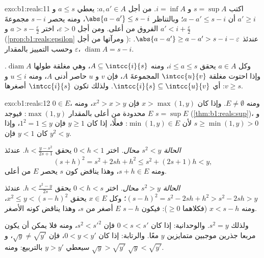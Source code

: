 \begin{solution}{exo:b1:reals:11}
اكتب $s = \sup A$ و $i = \inf A$. من أجل $a, a' \in A$: يعطي $a \leq s$
و $a' \geq i$ أن $a - a' \leq s - i$؛ وبالتناظر $\abs{a -
a'} \leq s - i$، ومنه يحصر $s - i$ مجموعةَ الفروق من أعلى. ومن أجل
$\varepsilon > 0$، اختر $a > s - \frac\varepsilon2$ و $a' < i
+ \frac\varepsilon2$ (\cref{prop:b1:reals:epsilon} ومرآتها
من أجل ): عندئذ $\abs{a - a'} \geq a - a' > s - i -
\varepsilon$. وحسب التمييز بالمقدار $\varepsilon$،
$\operatorname{diam} A = s - i$.

وكل $a \in A$ يحقق $i \leq a \leq s$، ومنه $A \subseteq
\intcc{i}{s}$، وهي  مغلقة طولها $\operatorname{diam}
A$. وإذا احتوت  مغلقة $\intcc{u}{v}$ المجموعةَ $A$، فإن $v$
 و $u$ حاصر أدنى  $A$، ومنه $u \leq i$ و $v
\geq s$: أي $\intcc{i}{s} \subseteq \intcc{u}{v}$. ولذلك
تكون $\intcc{i}{s}$ أصغرها.
\end{solution}

\begin{solution}{exo:b1:reals:12}
$0 \in E$، ومنه $E \neq \emptyset$. وإذا كان $x > \max(1, y)$ فإن $x^2 >
x > y$، ومنه  $E$ محدودة من أعلى بالمقدار $\max(1, y)$: فيوجد $s = \sup E$
(\cref{thm:b1:reals:sup})، و $s \geq \min(1, y) > 0$
لأن $\min(1, y) \in E$: فعلًا، إذا كان $y \geq 1$ فإن $1^2 = 1
\leq y$، وإذا كان $y < 1$ فإن $y^2 < y$.

\emph{الحالة $s^2 < y$ محال.} اختر $0 < h < 1$ يحقق $h <
\frac{y - s^2}{2s + 1}$. عندئذ
\[
(s + h)^2 = s^2 + 2sh + h^2 \leq s^2 + (2s + 1)h < y ,
\]
ومنه $s + h \in E$، وهذا يناقض كون $s$ يحصر $E$ من أعلى.

\emph{الحالة $s^2 > y$ محال.} اختر $0 < h < s$ يحقق $h <
\frac{s^2 - y}{2s}$. عندئذ $(s - h)^2 = s^2 - 2sh + h^2 > s^2 -
2sh > y$؛ وكل $x \in E$ يحقق $x^2 \leq y < (s - h)^2$،
ومنه $x < s - h$ (فكلاهما $\geq 0$): فيكون $s - h$ 
 $E$ أصغر من $s$، وهذا يناقض كونه الأصغر.

ولذلك $s^2 = y$. والوحدانية: إذا كان $0 < s < s'$ فإن $s^2 <
s'^2$، ومنه فلا يمكن أن يكون مربعا جذرين موجبين متمايزين $y$ معًا.
والرتابة: إذا كان $0 < y < y'$، فإن $\sqrt y \neq \sqrt{y'}$، و
$\sqrt y > \sqrt{y'}$ سيعطي $y > y'$ بالتربيع: ومنه $\sqrt
y < \sqrt{y'}$.
\end{solution}

